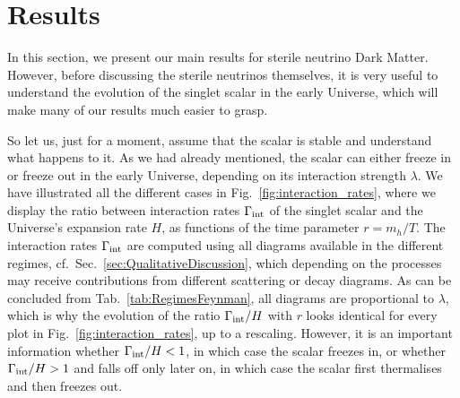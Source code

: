 \section{\label{sec:Results}Results}

In this section, we present our main results for sterile neutrino Dark Matter. However, before discussing the sterile neutrinos themselves, it is very useful to understand the evolution of the singlet scalar in the early Universe, which will make many of our results much easier to grasp.

So let us, just for a moment, assume that the scalar is stable and understand what happens to it. As we had already mentioned, the scalar can either freeze in or freeze out in the early Universe, depending on its interaction strength $\lambda$. We have illustrated all the different cases in Fig.~\ref{fig:interaction_rates}, where we display the ratio between interaction rates $\Gamma_{\rm int}$ of the singlet scalar and the Universe's expansion rate $H$, as functions of the time parameter $r=m_h/T$. The interaction rates $\Gamma_{\rm int}$ are computed using all diagrams available in the different regimes, cf.\ Sec.~\ref{sec:QualitativeDiscussion}, which depending on the processes may receive contributions from different scattering or decay diagrams. As can be concluded from Tab.~\ref{tab:RegimesFeynman}, all diagrams are proportional to $\lambda$, which is why the evolution of the ratio $\Gamma_{\rm int}/H$ with $r$ looks identical for every plot in Fig.~\ref{fig:interaction_rates}, up to a rescaling. However, it is an important information whether $\Gamma_{\rm int}/H < 1$, in which case the scalar freezes in, or whether $\Gamma_{\rm int}/H>1$ and falls off only later on, in which case the scalar first thermalises and then freezes out.

